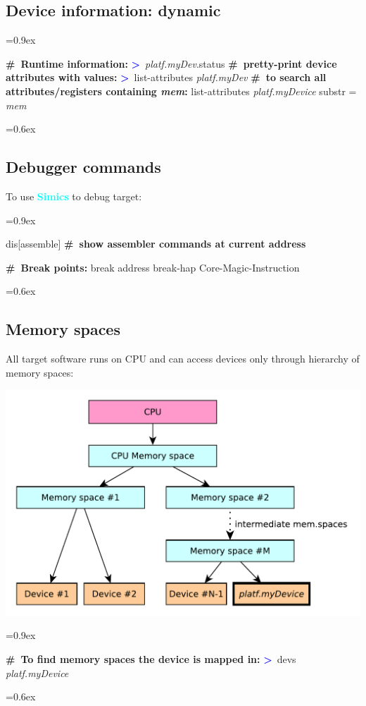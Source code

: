 \documentclass[8pt]{extarticle}
\newenvironment{code}[1][]{%
\begin{prebox}[#1]\obeylines%
\fontdimen2\font=0.9ex%
}{%
\end{prebox}%
\fontdimen2\font=0.6ex%
}
\newcommand{\sprompt}{\textcolor{blue}{\textbf{>}\ }}
\newcommand{\cmtcommon}[1]{\textcolor{Sepia}{\textbf{#1}}}
\newcommand{\cmt}[1]{\cmtcommon{\#\ #1}}
\newcommand{\p}[1]{\textit{\large#1}}
\newcommand{\Simics}{\textcolor{cyan}{\textbf{Simics}}}
\begin{document}
\begin{multicols*}{3}
\subsection{Device information: dynamic}

\begin{code}
    \cmt{Runtime information:}
    \sprompt \p{platf.myDev}.status
    \cmt{pretty-print device attributes with values:}
    \sprompt list-attributes \p{platf.myDev}
    \cmt{to search all attributes/registers containing \p{mem}:}
    list-attributes \p{platf.myDevice} substr = \p{mem}
\end{code}


\subsection{Debugger commands}
To use \Simics{} to debug target:
\begin{code}
dis[assemble] \cmt{show assembler commands at current address}

\cmt{Break points:}
break address
break-hap Core-Magic-Instruction
\end{code}

\subsection{Memory spaces}

All target software runs on CPU and can access devices only through
hierarchy of memory spaces:

\noindent\includegraphics[width=\linewidth]{diagrams/mem_spaces.pdf}

\begin{code}
    \cmt{To find memory spaces the device is mapped in:}
    \sprompt devs \p{platf.myDevice}
\end{code}


\end{multicols*}
\end{document}
